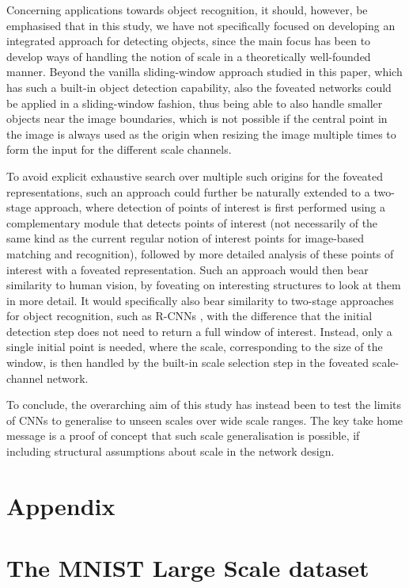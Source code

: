 \documentclass[twocolumn,runningheads]{svjour3}
\begin{document}
Concerning applications towards object recognition, it should, however, be
emphasised that in this study, we have not specifically focused on
developing an integrated approach for detecting objects,
since the main focus has been to develop ways of handling the notion
of scale in a theoretically well-founded manner. Beyond the vanilla
sliding-window approach studied in this paper, which has such a built-in object detection
capability, also the foveated networks could be applied in a
sliding-window fashion, thus being able to also handle smaller objects
near the image boundaries, which is not possible if the central point
in the image is always used as the origin when resizing the image multiple
times to form the input for the different scale channels.

To avoid
explicit exhaustive search over multiple such origins for the foveated
representations, such an approach could further be naturally extended to a
two-stage approach, where
detection of points of interest is first performed using a
complementary module that detects points of interest (not
necessarily of the same kind as the current regular notion of interest points for
image-based matching and recognition),
followed by more detailed analysis of these points of interest with a
foveated representation. Such an approach would then bear
similarity to human vision, by foveating on interesting structures
to look at them in more detail. It would specifically also bear similarity to
two-stage approaches for object recognition, such as R-CNNs
\cite{GirDonDarMal14-CVPR,Gir15-ICCV,RenHeGirSun17-PAMI}, with the
difference that the initial detection step does not need to return
a full window of interest. Instead, only a single initial point is needed, where
the scale, corresponding to the size of the window, is then handled
by the built-in scale selection step in the foveated scale-channel
network. 

To conclude, the overarching aim of this study has instead been to test the limits of
CNNs to generalise to unseen scales over wide scale ranges. The key
take home message is a proof of concept that such scale generalisation is
possible, if including structural assumptions about scale in the
network design. 

\appendix
\normalsize

\section*{Appendix}

\section{The MNIST Large Scale dataset}
\label{app-mnist-large-scale}
\end{document}

